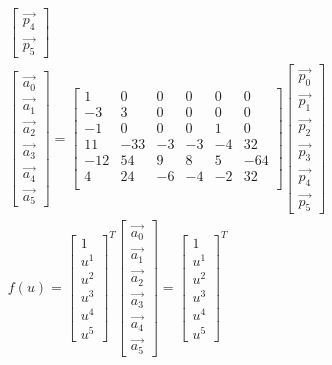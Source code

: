\documentclass{letter}
\begin{document}
\begin{align*}
\begin{bmatrix}
\vec{p_4} \\
\vec{p_5} 
\end{bmatrix}
\\
\begin{bmatrix}
\vec{a_0} \\
\vec{a_1} \\
\vec{a_2} \\
\vec{a_3} \\
\vec{a_4} \\
\vec{a_5} 
\end{bmatrix}
=
\begin{bmatrix}
1 & 0 & 0 & 0 & 0 & 0 \\
-3 & 3 & 0 & 0 & 0 & 0 \\
-1 & 0 & 0 & 0 & 1 & 0 \\
11 & -33 & -3 & -3 & -4 & 32 \\
-12 & 54 & 9 & 8 & 5 & -64 \\
4 & 24 & -6 & -4 & -2 & 32 \\
\end{bmatrix}
\begin{bmatrix}
\vec{p_0} \\
\vec{p_1} \\
\vec{p_2} \\
\vec{p_3} \\
\vec{p_4} \\
\vec{p_5} 
\end{bmatrix}
\\
f(u) =
\begin{bmatrix}
1 \\
{u^1} \\
{u^2} \\
{u^3} \\
{u^4} \\
{u^5} 
\end{bmatrix}^{T}
\begin{bmatrix}
\vec{a_0} \\
\vec{a_1} \\
\vec{a_2} \\
\vec{a_3} \\
\vec{a_4} \\
\vec{a_5} 
\end{bmatrix}
=
\begin{bmatrix}
1 \\
{u^1} \\
{u^2} \\
{u^3} \\
{u^4} \\
{u^5} 
\end{bmatrix}^{T}

\end{align*}
\end{document}
